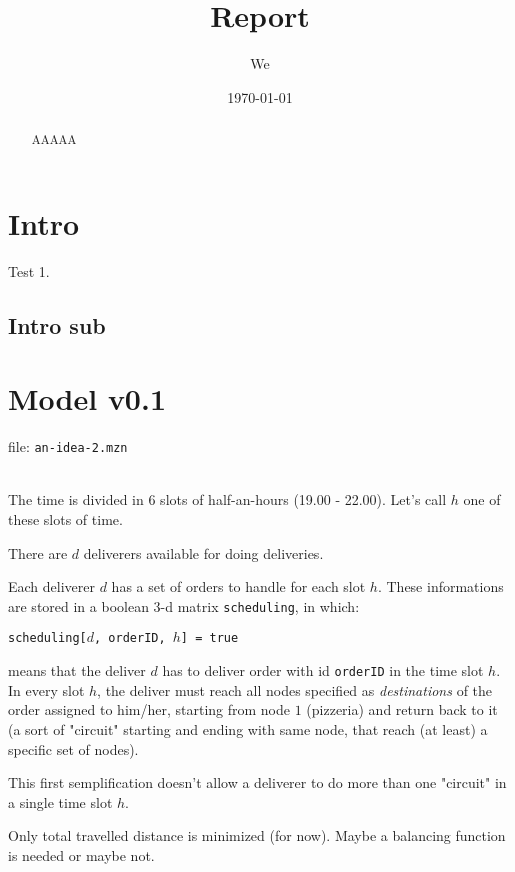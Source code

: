 \documentclass[10pt]{article}
\title{Report}
\date{\today}
\author{We}
\begin{document}
	\maketitle

	\begin{abstract}

		AAAAA
		
	\end{abstract}

	\tableofcontents

	\section{Intro}

	Test 1.

	\subsection{Intro sub}

	\section{Model v0.1}

	file: \texttt{an-idea-2.mzn}\\~\

	The time is divided in 6 slots of half-an-hours (19.00 - 22.00). Let's call $h$ one of these slots of time. 

	There are $d$ deliverers available for doing deliveries.

	Each deliverer $d$ has a set of orders to handle for each slot $h$. These informations are stored in a boolean 3-d matrix \texttt{scheduling}, in which:
	\begin{center}
		\texttt{scheduling[$d$, orderID, $h$] = true}
	\end{center} 
	means that the deliver $d$ has to deliver order with id \texttt{orderID} in the time slot $h$. In every slot $h$, the deliver must reach all nodes specified as \textit{destinations} of the order assigned to him/her, starting from node $1$ (pizzeria) and return back to it (a sort of "circuit" starting and ending with same node, that reach (at least) a specific set of nodes). 

	This first semplification doesn't allow a deliverer to do more than one "circuit" in a single time slot $h$. 

	Only total travelled distance is minimized (for now). Maybe a balancing function is needed or maybe not.
\end{document}
